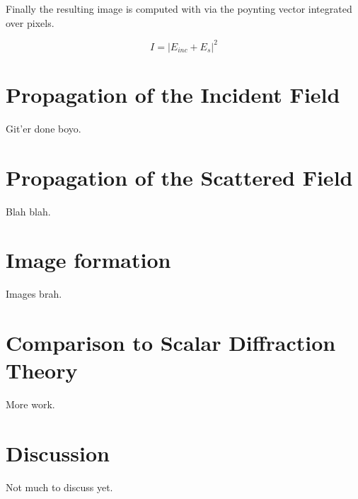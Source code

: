 Finally the resulting image is computed with via the poynting vector integrated over pixels.

\begin{equation*}
  I = \left | E_{inc} + E_{s} \right |^2 
\end{equation*}

\section{Propagation of the Incident Field}
Git'er done boyo.

\section{Propagation of the Scattered Field}

Blah blah.

\section{Image formation}

Images brah.

\section{Comparison to Scalar Diffraction Theory}

More work.

\section{Discussion}

Not much to discuss yet.


